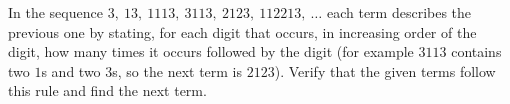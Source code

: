 In the sequence $3,\ 13,\ 1113,\ 3113,\ 2123,\ 112213,\ \dots$ each term describes the previous one by stating, for each digit that occurs, in increasing order of the digit, how many times it occurs followed by the digit (for example $3113$ contains two $1$s and two $3$s, so the next term is $2123$). Verify that the given terms follow this rule and find the next term.
